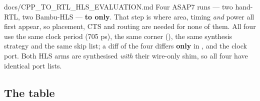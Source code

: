 \begin{relocated}{docs/CPP_TO_RTL_HLS_EVALUATION.md}
Four ASAP7 runs --- two hand-RTL, two Bambu-HLS --- \textbf{to
 only}. That step is where area, timing
\emph{and} power all first appear, so placement, CTS and routing are
needed for none of them. All four use the same clock period (705 ps),
the same corner (), the same synthesis strategy
and the same skip list; a diff of the four  differs
\textbf{only} in ,  and the clock
port. Both HLS arms are synthesised \emph{with} their wire-only shim, so
all four have identical port lists.

\subsection{The table}\label{tm:dec:cpp-to-rtl-hls-evaluation:the-table}

\begin{landscape}
\small\setlength{\tabcolsep}{4pt}


\end{landscape}
\end{relocated}
